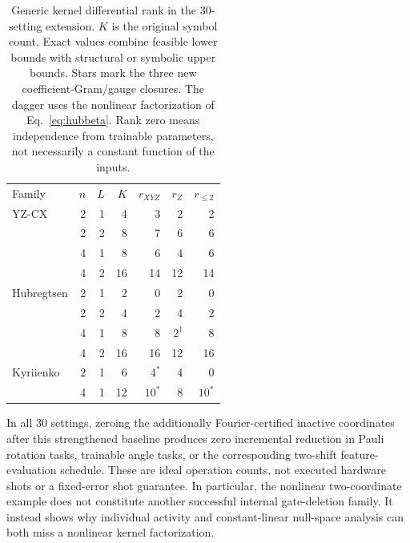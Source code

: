 \begin{table}[t]
\caption{Generic kernel differential rank in the 30-setting extension.
$K$ is the original symbol count. Exact values combine feasible
lower bounds with structural or symbolic upper bounds. Stars mark
the three new coefficient-Gram/gauge closures. The dagger
uses the nonlinear factorization of Eq.~\eqref{eq:hubbeta}.
Rank zero means independence from trainable parameters, not necessarily
a constant function of the inputs.}
\label{tab:extension}
\begin{tabular}{lrrrrrr}
\toprule
Family & $n$ & $L$ & $K$ & $r_{XYZ}$ & $r_Z$ & $r_{\le2}$\\
YZ-CX &2&1&4&3&2&2\\
 &2&2&8&7&6&6\\
 &4&1&8&6&4&6\\
 &4&2&16&14&12&14\\
Hubregtsen &2&1&2&0&2&0\\
 &2&2&4&2&4&2\\
 &4&1&8&8&$2^\dagger$&8\\
 &4&2&16&16&12&16\\
Kyriienko &2&1&6&$4^*$&4&0\\
 &4&1&12&$10^*$&8&$10^*$\\
\bottomrule
\end{tabular}
\end{table}

In all 30 settings, zeroing the additionally Fourier-certified
inactive coordinates after this strengthened baseline produces zero
incremental reduction in Pauli rotation tasks, trainable angle tasks,
or the corresponding two-shift feature-evaluation schedule. These are
ideal operation counts, not executed hardware shots or a fixed-error
shot guarantee. In particular, the nonlinear two-coordinate example
does not constitute another successful internal gate-deletion family.
It instead shows why individual activity and constant-linear null-space
analysis can both miss a nonlinear kernel factorization.
